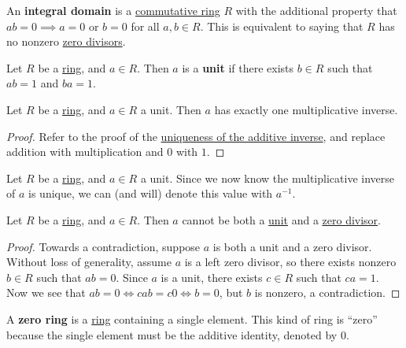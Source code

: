 \documentclass{scrartcl}
\begin{document}
\begin{definition}
    An \textbf{integral domain} is a \hyperref[def:commutative ring]{commutative ring} $R$ with the additional property
    that $ab=0\implies a=0\text{ or }b=0$ for all $a,b\in R$.
    This is equivalent to saying that $R$ has no nonzero \hyperref[def:zero divisor]{zero divisors}.
\end{definition}

\begin{definition}[Unit]
    \label{def:unit}
    Let $R$ be a \hyperref[def:ring]{ring}, and $a\in R$.
    Then $a$ is a \textbf{unit} if there exists $b\in R$ such that $ab=1$ and $ba=1$.
\end{definition}

\begin{proposition}
    \label{prop:unique multiplicative inverse}
    Let $R$ be a \hyperref[def:ring]{ring}, and $a\in R$ a unit.
    Then $a$ has exactly one multiplicative inverse.
\end{proposition}

\begin{proof}
    Refer to the proof of the \hyperref[prop:unique additive inverse]{uniqueness of the additive inverse}, and replace
    addition with multiplication and $0$ with $1$.
\end{proof}

Let $R$ be a \hyperref[def:ring]{ring}, and $a\in R$ a unit.
Since we now know the multiplicative inverse of $a$ is unique, we can (and will) denote this value with $a^{-1}$.

\begin{proposition}
    Let $R$ be a \hyperref[def:ring]{ring}, and $a\in R$.
    Then $a$ cannot be both a \hyperref[def:unit]{unit} and a \hyperref[def:zero divisor]{zero divisor}.
\end{proposition}

\begin{proof}
    Towards a contradiction, suppose $a$ is both a unit and a zero divisor.
    Without loss of generality, assume $a$ is a left zero divisor, so there exists nonzero $b\in R$ such that $ab=0$.
    Since $a$ is a unit, there exists $c\in R$ such that $ca=1$.
    Now we see that $ab=0\iff cab=c0\iff b=0$, but $b$ is nonzero, a contradiction.
\end{proof}

\begin{definition}
    \label{def:nonzero ring}
    A \textbf{zero ring} is a \hyperref[def:ring]{ring} containing a single element.
    This kind of ring is ``zero'' because the single element must be the additive identity, denoted by $0$.
\end{definition}
\end{document}
